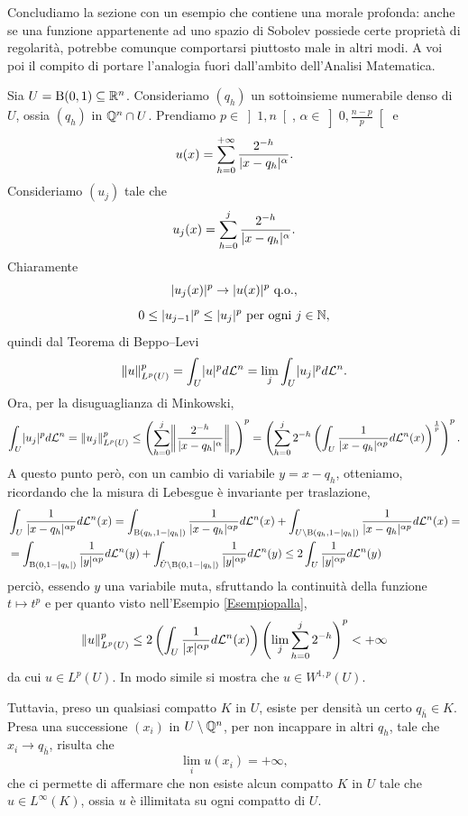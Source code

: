 Concludiamo la sezione con un esempio che contiene una morale profonda: anche se una funzione appartenente ad uno spazio di Sobolev possiede certe proprietà di regolarità, potrebbe comunque comportarsi piuttosto male in altri modi. A voi poi il compito di portare l'analogia fuori dall'ambito dell'Analisi Matematica.
\begin{esempio}
	Sia $U = \textup{B}(0,1) \subseteq \mathbb{R}^n$. Consideriamo $(q_h)$ un sottoinsieme numerabile denso di $U$, ossia $(q_h)$ in $\mathbb{Q}^n \cap U$. Prendiamo $p \in \left] 1,n\right[ $, $\alpha \in \left] 0,\frac{n-p}{p}\right[ $ e 
	\[ u(x) = \sum_{h= 0 }^{+\infty} \frac{2^{-h}}{\lvert x-q_h\rvert^\alpha}. \] 
	Consideriamo $(u_j)$ tale che
	\[ u_j(x) = \sum_{h= 0 }^{j} \frac{2^{-h}}{\lvert x-q_h\rvert^\alpha}. \]
	Chiaramente
	\[ \lvert u_j(x)\rvert^p \to \lvert u(x)\rvert^p \textup{ q.o.}, \]
	\[ 0 \le \lvert u_{j-1}\rvert^p\le \lvert u_{j}\rvert^p \textup{ per ogni  } j \in \mathbb{N},\]
	quindi dal Teorema di Beppo--Levi
	\[ \lVert u\rVert_{L^p(U)}^p = \int_U \lvert u\rvert^pd\mathcal{L}^n = \lim_j \int_U \lvert u_j\rvert^pd\mathcal{L}^n. \] 
	Ora, per la disuguaglianza di Minkowski,
	\[ \int_U \abs{u_j}^pd\mathcal{L}^n = \norm{u_j}_{L^p(U)}^p \le \left( \sum_{h= 0 }^j \norm*{\frac{2^{-h}}{\abs{x-q_h}^\alpha}}_p \right) ^p = \left( \sum_{h= 0 }^j 2^{-h}\left( \int_{U} \frac{1}{\abs{x-q_h}^{\alpha p}}d\mathcal{L}^n(x)\right) ^{\frac{1}{p}}\right) ^{p}. \]
	A questo punto però, con un cambio di variabile $y = x - q_h$, otteniamo, ricordando che la misura di Lebesgue è invariante per traslazione,
	\begin{align*}
		&\int_{U} \frac{1}{\lvert x-q_h\rvert^{\alpha p}}d\mathcal{L}^n(x) = \int_{\textup{B}(q_h,1-\lvert q_h\rvert)} \frac{1}{\lvert x-q_h\rvert^{\alpha p}}d\mathcal{L}^n(x) + \int_{U \setminus \textup{B}(q_h,1-\lvert q_h\rvert)} \frac{1}{\lvert x-q_h\rvert^{\alpha p}}d\mathcal{L}^n(x) = \\ 
		&= \int_{\textup{B}(0,1-\lvert q_h\rvert)} \frac{1}{\lvert y\rvert^{\alpha p}}d\mathcal{L}^n(y) + \int_{\tilde{U}\setminus \textup{B}(0,1-\lvert q_h\rvert)} \frac{1}{\lvert y\rvert^{\alpha p}}d\mathcal{L}^n(y)\le 2 \int_{U} \frac{1}{\lvert y\rvert^{\alpha p}}d\mathcal{L}^n(y)
	\end{align*}
	perciò, essendo $y$ una variabile muta, sfruttando la continuità della funzione $t \mapsto t^p$ e per quanto visto nell'Esempio \eqref{Esempiopalla},
	\[  \lVert u\rVert_{L^p(U)}^p  \le 2 \left( \int_{U} \frac{1}{\lvert x\rvert^{\alpha p}}d\mathcal{L}^n(x)\right) \left( \lim_{j} \sum_{h=0}^{j} 2^{-h}\right) ^p < +\infty  \]
	da cui $u \in L^p(U)$. In modo simile si mostra che $u \in W^{1,p}(U)$.
	
	Tuttavia, preso un qualsiasi compatto $K$ in $U$, esiste per densità un certo $q_{\bar{h}} \in K$. Presa una successione $(x_i)$ in $U\setminus \mathbb{Q}^n$, per non incappare in altri $q_h$, tale che $x_i \to q_{\bar{h}}$, risulta che 
	\[ \lim_{i} u(x_i) = +\infty, \]
	che ci permette di affermare che non esiste alcun compatto $K$ in $U$ tale che $u \in L^\infty(K)$, ossia $u$ è illimitata su ogni compatto di $U$.
\end{esempio}

